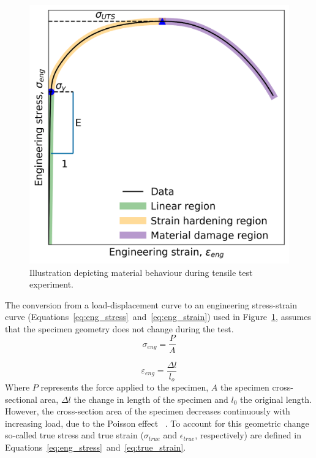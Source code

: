 \documentclass[preprint, review, 12pt]{elsarticle}
\begin{document}
	\begin{figure}[!htbp]
		\centering
		\includegraphics[width=\linewidth, height=0.4\textheight, keepaspectratio]{DIAGRAM_ENG_SS}
		\caption{Illustration depicting material behaviour during tensile test experiment.}
		\label{fig:eng_ss}
	\end{figure}
	The conversion from a load-displacement curve to an engineering stress-strain curve (Equations~\ref{eq:eng_stress}~and~\ref{eq:eng_strain}) used in Figure~\ref{fig:eng_ss}, assumes that the specimen geometry does not change during the test.
		\begin{equation}
		\sigma_{eng} = \frac{P}{A}
		\label{eq:eng_stress}
	\end{equation}

	\begin{equation}
		\varepsilon_{eng} = \frac{\Delta l}{l_o}
		\label{eq:eng_strain}
	\end{equation}
	Where $P$ represents the force applied to the specimen, $A$ the specimen cross-sectional area, $\Delta l$ the change in length of the specimen and $l_0$ the original length.
	However, the cross-section area of the specimen decreases continuously with increasing load, due to the Poisson effect ~\cite{YOUNG2001}.
	To account for this geometric change so-called true stress and true strain ($\sigma_{true}$ and $\epsilon_{true}$, respectively) are defined in Equations~\ref{eq:eng_stress}~and~\ref{eq:true_strain}.
\end{document}
